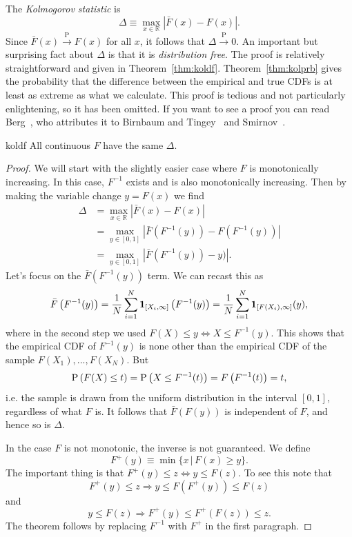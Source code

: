 The {\it Kolmogorov statistic} is
\begin{equation}
  \Delta\equiv\max_{x\in\mathbb{R}}\left|\bar{F}(x)-F(x)\right|.
\end{equation}
Since $\bar{F}(x)\xrightarrow{\text{P}}F(x)$ for all $x$, it follows
that $\Delta\xrightarrow{\text{P}}0$. An important but surprising
fact about $\Delta$ is that it is {\it distribution free}.
The proof is relatively straightforward and given in
Theorem~\ref{thm:koldf}. Theorem~\ref{thm:kolprb} gives
the probability that the difference between the empirical and true
CDFs is at least as extreme as what we calculate. This proof is
tedious and not particularly enlightening, so it has been omitted.
If you want to see a proof you can read Berg~\cite{berg_markov_2004},
who attributes it to Birnbaum and Tingey~\cite{birnbaum_one-sided_1951}
and Smirnov~\cite{smirnoff_sur_1939}.
\begin{theorem}{}{koldf}
  All continuous $F$ have the same $\Delta$. 
  \begin{proof}
    We will start with the slightly easier case where $F$ is monotonically
    increasing. In this case, $F^{-1}$ exists and is also monotonically
    increasing. Then by making the variable change $y=F(x)$ we find
    \begin{equation*}
      \begin{aligned}
      \Delta&=\max_{x\in\mathbb{R}}\left|\bar{F}(x)-F(x)\right|\\
            &=\max_{y\in[0,1]}\left|
                \bar{F}\left(F^{-1}(y)\right)-F\left(F^{-1}(y)\right)\right|\\
            &=\max_{y\in[0,1]}\left|
                \bar{F}\left(F^{-1}(y)\right)-y)\right|.
      \end{aligned}
    \end{equation*}
    Let's focus on the $\bar{F}(F^{-1}(y))$ term. We can recast this as
    $$
      \bar{F}\left(F^{-1}(y)\right)
          =\frac{1}{N}\sum_{i=1}^N{\mathbf 1}_{[X_i,\infty]}\left(F^{-1}(y)\right)
          =\frac{1}{N}\sum_{i=1}^N{\mathbf 1}_{[F(X_i),\infty]}(y),
    $$
    where in the second step we used 
    $F(X)\leq y\Leftrightarrow X\leq F^{-1}(y)$. This shows that the
    empirical CDF of $F^{-1}(y)$ is none other than the empirical CDF 
    of the sample $F(X_1),...,F(X_N)$. But
    $$
      \operatorname{P}\left(F(X)\leq t\right)=\operatorname{P}\left(X\leq F^{-1}(t)\right)=F\left(F^{-1}(t)\right)=t,
    $$
    i.e. the sample is drawn from the uniform distribution in the
    interval $[0,1]$, regardless of what $F$ is. It follows that 
    $\bar{F}\left(F(y)\right)$ is independent of $F$, and hence so 
    is $\Delta$.

    In the case $F$ is not monotonic, the inverse is not guaranteed.
    We define
    $$
      F^+(y)\equiv\min\{x\,|\,F(x)\geq y\}.
    $$
    The important thing is that $F^+(y)\leq z\Leftrightarrow y\leq F(z)$.
    To see this note that
    $$
      F^+(y)\leq z \Rightarrow y\leq F\left(F^+(y)\right)\leq F(z)
    $$
    and
    $$
      y\leq F(z)\Rightarrow F^+(y)\leq F^+\left(F(z)\right)\leq z.
    $$
    The theorem follows by replacing $F^{-1}$ with $F^+$ 
    in the first paragraph.
  \end{proof}
\end{theorem}
